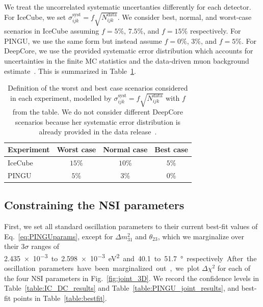 \documentclass[draft=True]{revtex4-2}
\newcommand{\dm}{\Delta m^2_{31}}
\begin{document}
We treat the uncorrelated systematic uncertanties differently for each detector. For IceCube, we set $\sigma_{ijk}^\text{syst} = f\sqrt{N_{ijk}^\text{data}}$. We consider best, normal, and worst-case scenarios in IceCube assuming
$f=5\%$, $7.5\%$, and $f=15\%$ respectively. For PINGU, we use the same form but instead assume $f=0\%$, $3\%$, and $f=5\%$. %
For DeepCore, we use the provided systematic error distribution which accounts for uncertainties in the finite MC statistics and the data-driven 
muon background estimate~\cite{DC2019data}. This is summarized in Table~\ref{table:syst_errors}.  %
{\renewcommand{\arraystretch}{1.2}
\begin{table}
   \begin{tabular}{lccc}
      \hline \hline
      Experiment & Worst case & Normal case & Best case \\
      \hline
      IceCube & $15\%$ & $10\%$ & $5\%$ \\
      PINGU & $5\%$ & $3\%$ & $0\%$ \\
      \hline \hline
   \end{tabular}
   \caption{Definition of the worst and best case scenarios considered in each experiment, modelled by $\sigma_{ijk}^\text{syst} = f\sqrt{N_{ijk}^\text{data}}$ with $f$ from the table.
   We do not consider different DeepCore scenarios because her systematic error distribution is already provided in the data release~\cite{DC2019data}.}\label{table:syst_errors}
\end{table}

\subsection{Constraining the NSI parameters}
First, we set all standard oscillation parameters to their current best-fit values of Eq.~\ref{eq:PINGUparams}, except for $\dm$ and $\theta_{23}$, 
which we marginalize over their $3\sigma$ ranges of \SI{2.435e-3} to \SI{2.598e-3}{\electronvolt^2} and \SI{40.1} to \SI{51.7}{\degree} respectively. %
After the oscillation parameters have been marginalized out, we plot $\Delta \chi^2$ for each of the four NSI parameters in Fig.~\ref{fig:joint_3D}. We record the 
confidence levels in Table~\ref{table:IC_DC_results} and Table~\ref{table:PINGU_joint_results}, and best-fit points in Table~\ref{table:bestfit}.

}
\end{document}
